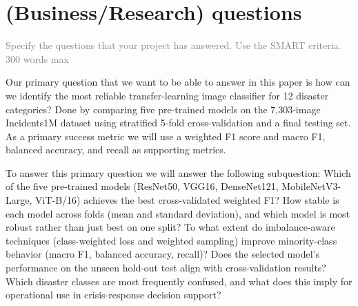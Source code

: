 \documentclass{article}
\begin{document}
\section{(Business/Research) questions}
\textcolor{gray}{Specify the questions that your project has answered. Use the SMART criteria. 300 words max}

Our primary question that we want to be able to answer in this paper is how can we identify the most reliable transfer-learning image classifier for 12 disaster categories? Done by comparing five pre-trained models on the 7,303-image Incidents1M dataset using stratified 5-fold cross-validation and a final testing set. As a primary success metric we will use a weighted F1 score and macro F1, balanced accuracy, and recall as supporting metrics.

To answer this primary question we will answer the following subquestion:
Which of the five pre-trained models (ResNet50, VGG16, DenseNet121, MobileNetV3-Large, ViT-B/16) achieves the best cross-validated weighted F1?
How stable is each model across folds (mean and standard deviation), and which model is most robust rather than just best on one split?
To what extent do imbalance-aware techniques (class-weighted loss and weighted sampling) improve minority-class behavior (macro F1, balanced accuracy, recall)?
Does the selected model’s performance on the unseen hold-out test align with cross-validation results?
Which disaster classes are most frequently confused, and what does this imply for operational use in crisis-response decision support?


\end{document}

